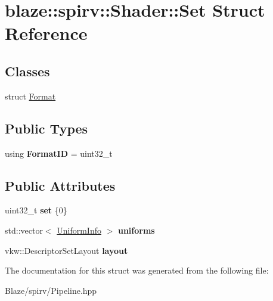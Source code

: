 \hypertarget{structblaze_1_1spirv_1_1Shader_1_1Set}{}\section{blaze\+:\+:spirv\+:\+:Shader\+:\+:Set Struct Reference}
\label{structblaze_1_1spirv_1_1Shader_1_1Set}
\subsection*{Classes}
\begin{DoxyCompactItemize}
\item 
struct \hyperlink{structblaze_1_1spirv_1_1Shader_1_1Set_1_1Format}{Format}
\end{DoxyCompactItemize}
\subsection*{Public Types}
\begin{DoxyCompactItemize}
\item 
\mbox{\label{structblaze_1_1spirv_1_1Shader_1_1Set_a2033e85411f74aa7415d4c6cc33cdec3}} 
using {\bfseries Format\+ID} = uint32\+\_\+t
\end{DoxyCompactItemize}
\subsection*{Public Attributes}
\begin{DoxyCompactItemize}
\item 
\mbox{\label{structblaze_1_1spirv_1_1Shader_1_1Set_a094121b02cb71d38ace665fd0f55dbb5}} 
uint32\+\_\+t {\bfseries set} \{0\}
\item 
\mbox{\label{structblaze_1_1spirv_1_1Shader_1_1Set_a15f1ceed83a85eb92cdb57e41c4f5a3d}} 
std\+::vector$<$ \hyperlink{structblaze_1_1spirv_1_1UniformInfo}{Uniform\+Info} $>$ {\bfseries uniforms}
\item 
\mbox{\label{structblaze_1_1spirv_1_1Shader_1_1Set_a3c5cdc3bc52c2f3e036fcb2dccbe8f4b}} 
vkw\+::\+Descriptor\+Set\+Layout {\bfseries layout}
\end{DoxyCompactItemize}


The documentation for this struct was generated from the following file\+:\begin{DoxyCompactItemize}
\item 
Blaze/spirv/Pipeline.\+hpp\end{DoxyCompactItemize}
